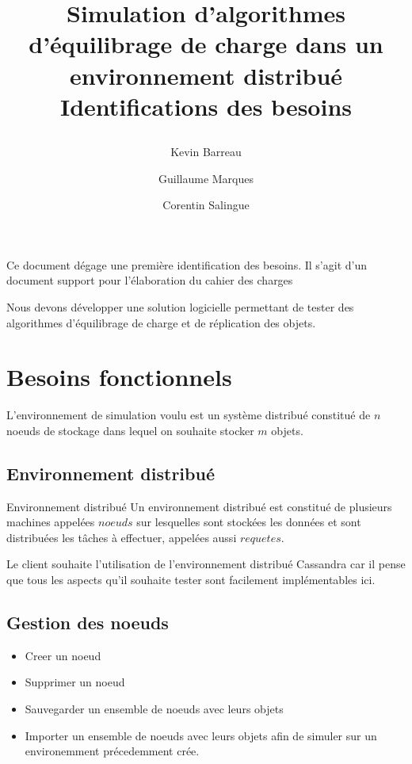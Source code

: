 \documentclass[12pt]{article}
\title{
 \begin{minipage}\linewidth
        \centering
        Simulation d'algorithmes d'équilibrage de charge dans un environnement distribué 
        \vskip3pt
        \large Identifications des besoins
    \end{minipage}
 }
\author{Kevin Barreau \and Guillaume Marques \and Corentin Salingue}
\begin{document}
\maketitle

\abstract
Ce document dégage une première identification des besoins.
Il s'agit d'un document support pour l'élaboration du cahier des charges

\newpage

Nous devons développer une solution logicielle permettant de tester des algorithmes d'équilibrage de charge et de réplication des objets.

\section{Besoins fonctionnels}

L'environnement de simulation voulu est un système distribué constitué de $n$ noeuds de stockage dans lequel on souhaite stocker $m$ objets.

\subsection{Environnement distribué}

\begin{bclogo}[ombre = true, epOmbre = 0.25, couleurOmbre = black!30, logo = \bcinfo, arrondi = 0.1]{Environnement distribué}
	Un environnement distribué est constitué de plusieurs machines appelées $noeuds$ sur lesquelles sont stockées les données et sont distribuées les tâches à effectuer, appelées aussi $requetes$.%
\end{bclogo}

	Le client souhaite l'utilisation de l'environnement distribué Cassandra car il pense que tous les aspects qu'il souhaite tester sont facilement implémentables ici.

\subsection{Gestion des noeuds}


\begin{itemize}
 \item Creer un noeud
 \item Supprimer un noeud
 \item Sauvegarder un ensemble de noeuds avec leurs objets
 \item Importer un ensemble de noeuds avec leurs objets afin de simuler sur un environemment précedemment crée.
\end{itemize}
\end{document}
